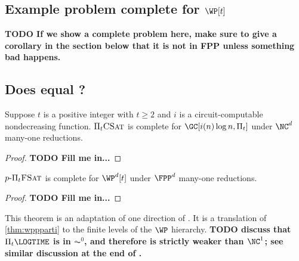 \documentclass{article}
\newcommand{\todo}[1]{\textbf{TODO #1}}
\newcommand{\dash}{\textnormal{-}}
\newcommand{\pPiFSAT}{p \dash \Pi_t \textsc{FSat}}
\newcommand{\PiCSAT}{\Pi_t \textsc{CSat}}
\begin{document}
\subsection{Example problem complete for \texorpdfstring{$\WP[t]$}{WP[t]}}

\todo{If we show a complete problem here, make sure to give a corollary in the section below that it is not in FPP unless something bad happens.}

\subsection{Does \texorpdfstring{\FPP}{FPP} equal \texorpdfstring{\WP[t]}{WP[t]}?}

\begin{theorem}\label{thm:picsatgc}
  Suppose $t$ is a positive integer with $t \geq 2$ and $i$ is a circuit-computable nondecreasing function.
  $\PiCSAT$ is complete for $\GC[i(n) \log n, \Pi_t]$ under $\NC^d$ many-one reductions.
\end{theorem}
\begin{proof}
  \todo{Fill me in...}
\end{proof}

\begin{theorem}\label{thm:ppifsat}
  $\pPiFSAT$ is complete for $\WP^d[t]$ under $\FPP^d$ many-one reductions.
\end{theorem}
\begin{proof}
  \todo{Fill me in...}
\end{proof}

This theorem is an adaptation of one direction of \autocite[Theorem~4.3]{cc97npo}.
It is a translation of \autoref{thm:wppparti} to the finite levels of the $\WP$ hierarchy.
\todo{discuss that $\Pi_t \LOGTIME$ is in $\AC^0$, and therefore is strictly weaker than $\NC^1$; see similar discussion at the end of \autocite{cc97npo}.}
\end{document}
